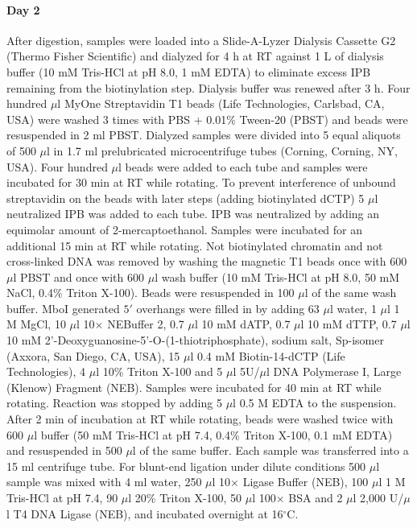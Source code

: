 \documentclass{article}
\begin{document}
\paragraph{Day 2}
After digestion, samples were loaded into a Slide-A-Lyzer Dialysis
Cassette G2 (Thermo Fisher Scientific) and dialyzed for 4 h at RT
against 1 L of dialysis buffer (10 mM Tris-HCl at pH 8.0, 1 mM EDTA)
to eliminate excess IPB remaining from the biotinylation
step. Dialysis buffer was renewed after 3 h. Four hundred $\mu$l MyOne
Streptavidin T1 beads (Life Technologies, Carlsbad, CA, USA) were
washed 3 times with PBS + 0.01\% Tween-20 (PBST) and beads were
resuspended in 2 ml PBST. Dialyzed samples were divided into 5 equal
aliquots of 500 $\mu$l in 1.7 ml prelubricated microcentrifuge tubes
(Corning, Corning, NY, USA). Four hundred $\mu$l beads were added to each
tube and samples were incubated for 30 min at RT while rotating. To
prevent interference of unbound streptavidin on the beads with later
steps (adding biotinylated dCTP) 5 $\mu$l neutralized IPB was added to
each tube. IPB was neutralized by adding an equimolar amount of
2-mercaptoethanol. Samples were incubated for an additional 15 min at
RT while rotating. Not biotinylated chromatin and not cross-linked DNA
was removed by washing the magnetic T1 beads once with 600 $\mu$l PBST and
once with 600 $\mu$l wash buffer (10 mM Tris-HCl at pH 8.0, 50 mM NaCl,
0.4\% Triton X-100). Beads were resuspended in 100 $\mu$l of the same wash
buffer. MboI generated $5'$ overhangs were filled in by adding 63 $\mu$l
water, 1 $\mu$l 1 M MgCl, 10 $\mu$l 10$\times$ NEBuffer 2, 0.7 $\mu$l 10 mM dATP, 0.7 $\mu$l
10 mM dTTP, 0.7 $\mu$l 10 mM 2'-Deoxyguanosine-5'-O-(1-thiotriphosphate),
sodium salt, Sp-isomer (Axxora, San Diego, CA, USA), 15 $\mu$l 0.4 mM
Biotin-14-dCTP (Life Technologies), 4 $\mu$l 10\% Triton X-100 and 5 $\mu$l
5U/$\mu$l DNA Polymerase I, Large (Klenow) Fragment (NEB). Samples were
incubated for 40 min at RT while rotating. Reaction was stopped by
adding 5 $\mu$l 0.5 M EDTA to the suspension. After 2 min of incubation at
RT while rotating, beads were washed twice with 600 $\mu$l buffer (50 mM
Tris-HCl at pH 7.4, 0.4\% Triton X-100, 0.1 mM EDTA) and resuspended
in 500 $\mu$l of the same buffer. Each sample was transferred into a 15 ml
centrifuge tube. For blunt-end ligation under dilute conditions 500 $\mu$l
sample was mixed with 4 ml water, 250 $\mu$l 10$\times$ Ligase Buffer (NEB), 100
$\mu$l 1 M Tris-HCl at pH 7.4, 90 $\mu$l 20\% Triton X-100, 50 $\mu$l 100$\times$ BSA and
2 $\mu$l 2,000 U/$\mu$l T4 DNA Ligase (NEB), and incubated overnight at 16$^\circ$C.
\end{document}
